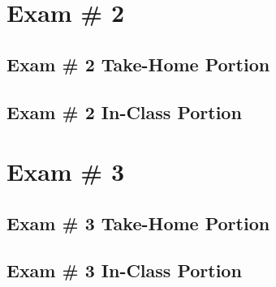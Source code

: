 \section{Exam \# 2 }
\subsection{Exam \# 2 Take-Home Portion}
\subsection{Exam \# 2 In-Class Portion}

\section{Exam \# 3 }
\subsection{Exam \# 3 Take-Home Portion}
\subsection{Exam \# 3 In-Class Portion}